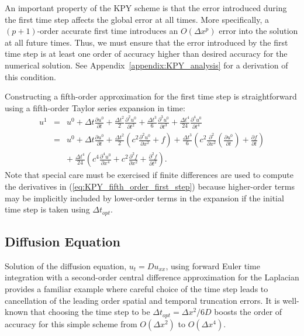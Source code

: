 \documentclass[fleqn,12pt,twoside]{article}
\newcommand{\bea}{\begin{eqnarray}}
\newcommand{\eea}{\end{eqnarray}}
\def\pt{\partial t}
\def\px{\partial x}
\def\dt{\Delta t}
\def\dx{\Delta x}
\def\dto{\dt_{opt}}
\begin{document}
An important property of the KPY scheme is that the error introduced during 
the first time step affects the global error at all times.  More specifically, 
a $(p+1)$-order accurate first time introduces an $O(\dx^p)$ error into the 
solution at all future times.
Thus, we must ensure that the error introduced by the first time step is
at least one order of accuracy higher than desired accuracy for the numerical 
solution.  See Appendix~\ref{appendix:KPY_analysis} for a derivation of this
condition. 

Constructing a fifth-order approximation for the first time step is 
straightforward using a fifth-order Taylor series expansion in time:
\bea
  u^1 &=& u^0 + \dt \frac{\partial u^0}{\pt} 
              + \frac{\dt^2}{2} \frac{\partial^2 u^0}{\pt^2}
              + \frac{\dt^3}{6} \frac{\partial^3 u^0}{\pt^3} 
           + \frac{\dt^4}{24} \frac{\partial^4 u^0}{\pt^4}
  \nonumber \\
  &=& u^0 + \dt \frac{\partial u^0}{\pt} 
          + \frac{\dt^2}{2} \left(c^2 \frac{\partial^2 u^0}{\px^2} + f\right)
  + \frac{\dt^3}{6} \left(c^2 
    \frac{\partial^2}{\px^2} \left(\frac{\partial u^0}{\pt} \right) 
    + \frac{\partial f}{\pt}\right)
  \nonumber \\
  & & +\  \frac{\dt^4}{24} \left(c^4 \frac{\partial^4 u^0}{\px^4} 
  + c^2 \frac{\partial ^2 f}{\px^2} + \frac{\partial^2 f}{\pt^2} \right).
  \label{eq:KPY_fifth_order_first_step}
\eea
Note that special care must be exercised if finite differences are used to 
compute the derivatives in (\ref{eq:KPY_fifth_order_first_step}) because
higher-order terms may be implicitly included by lower-order terms in the 
expansion if the initial time step is taken using $\dto$.


\subsection{Diffusion Equation \label{sec:diffusion_eqn_1d}}
Solution of the diffusion equation, $u_t = D u_{xx}$, using forward Euler 
time integration with a second-order central difference approximation for 
the Laplacian provides a familiar example where careful choice of the time 
step leads to cancellation of the leading order spatial and temporal 
truncation errors.  It is well-known that choosing the time step to be 
$\dto = \dx^2/6D$ boosts the order of accuracy for this simple scheme 
from $O(\dx^2)$ to $O(\dx^4)$.
\end{document}
